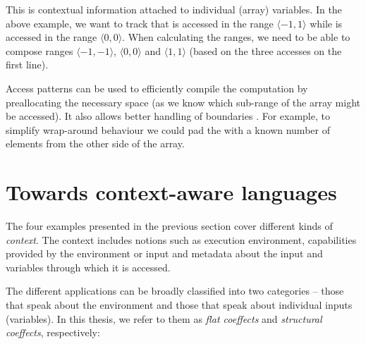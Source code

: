 This is contextual information attached to individual (array) variables.
In the above example, we want to track that  is accessed in the range $\langle-1, 1 \rangle$
while  is accessed in the range $\langle 0, 0 \rangle$. When calculating the ranges,
we need to be able to compose ranges $\langle-1,-1 \rangle$, $\langle 0,0 \rangle$ and $\langle 1,1 \rangle$
(based on the three accesses on the first line).

Access patterns can be used to efficiently compile the computation
by preallocating the necessary space (as we know which sub-range of the array might be accessed).
It also allows better handling of boundaries \cite{app-stencil-dsl}. For example, to simplify
wrap-around behaviour we could pad the  with a known number of elements from the
other side of the array.


%
%


\section{Towards context-aware languages}

The four examples presented in the previous section cover different kinds of \emph{context}.
The context includes notions such as execution environment, capabilities provided by the
environment or input and metadata about the input and variables through which it is accessed.

The different applications can be broadly classified into two categories -- those that
speak about the environment and those that speak about individual inputs (variables). In this
thesis, we refer to them as \emph{flat coeffects} and \emph{structural coeffects}, respectively:

